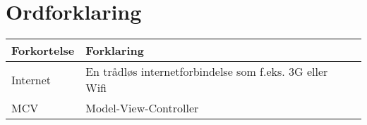 \chapter*{Ordforklaring}

\begin{tabularx}{\textwidth}{l l X} \hline
	\textbf{Forkortelse}  & \textbf{Forklaring} \\ \hline
	Internet&  En trådløs internetforbindelse som f.eks. 3G eller Wifi& \\
	MCV& Model-View-Controller& \\
	
\end{tabularx}
